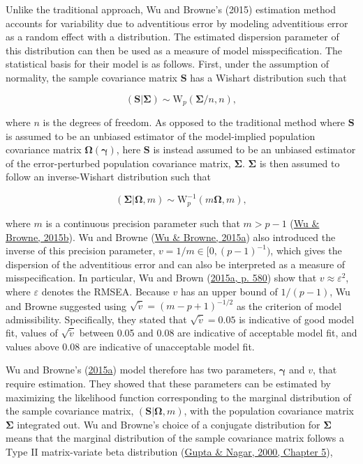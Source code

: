\documentclass[11pt]{umnthesis}
\begin{document}
Unlike the traditional approach, Wu and Browne's (2015) estimation method accounts for variability due to adventitious error by modeling adventitious error as a random effect with a distribution. The estimated dispersion parameter of this distribution can then be used as a measure of model misspecification. The statistical basis for their model is as follows. First, under the assumption of normality, the sample covariance matrix \(\mathbf{S}\) has a Wishart distribution such that

\begin{equation}
(\mathbf{S} | \bm{\Sigma}) \sim \textrm{W}_p(\bm{\Sigma}/n, n),
\label{eq:S-dist}
\end{equation}

\noindent where \(n\) is the degrees of freedom. As opposed to the traditional method where \(\mathbf{S}\) is assumed to be an unbiased estimator of the model-implied population covariance matrix \(\bm{\Omega}(\bm{\gamma})\), here \(\mathbf{S}\) is instead assumed to be an unbiased estimator of the error-perturbed population covariance matrix, \(\bm{\Sigma}\). \(\bm{\Sigma}\) is then assumed to follow an inverse-Wishart distribution such that

\begin{equation}
(\bm{\Sigma} | \bm{\Omega}, m) \sim \textrm{W}^{-1}_p (m \bm{\Omega}, m),
\label{eq:Sigma-dist}
\end{equation}

\noindent where \(m\) is a continuous precision parameter such that \(m > p-1\) (\protect\hyperlink{ref-wu2015a}{Wu \& Browne, 2015b}). Wu and Browne (\protect\hyperlink{ref-wu2015}{Wu \& Browne, 2015a}) also introduced the inverse of this precision parameter, \(v = 1/m \in [0, (p-1)^{-1})\), which gives the dispersion of the adventitious error and can also be interpreted as a measure of misspecification. In particular, Wu and Brown (\protect\hyperlink{ref-wu2015}{2015a, p. 580}) show that \(v \approx \varepsilon^2\), where \(\varepsilon\) denotes the RMSEA. Because \(v\) has an upper bound of \(1/(p-1)\), Wu and Browne suggested using \(\sqrt{\tilde{v}} = (m - p + 1)^{-1/2}\) as the criterion of model admissibility. Specifically, they stated that \(\sqrt{\tilde{v}} = 0.05\) is indicative of good model fit, values of \(\sqrt{\tilde{v}}\) between 0.05 and 0.08 are indicative of acceptable model fit, and values above 0.08 are indicative of unacceptable model fit.

Wu and Browne's (\protect\hyperlink{ref-wu2015}{2015a}) model therefore has two parameters, \(\bm{\gamma}\) and \(v\), that require estimation. They showed that these parameters can be estimated by maximizing the likelihood function corresponding to the marginal distribution of the sample covariance matrix, \((\mathbf{S} | \bm{\Omega}, m)\), with the population covariance matrix \(\bm{\Sigma}\) integrated out. Wu and Browne's choice of a conjugate distribution for \(\bm{\Sigma}\) means that the marginal distribution of the sample covariance matrix follows a Type II matrix-variate beta distribution (\protect\hyperlink{ref-gupta2000}{Gupta \& Nagar, 2000, Chapter 5}),
\end{document}
